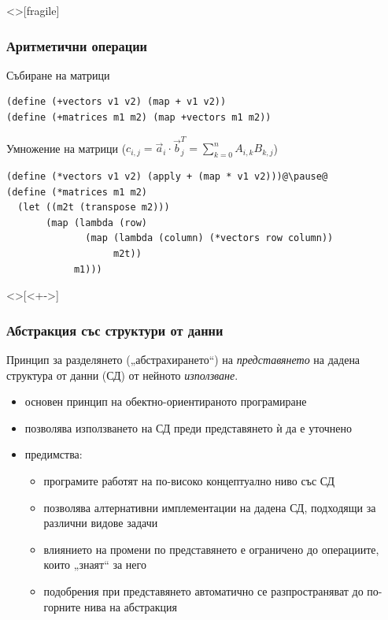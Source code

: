 \documentclass[alsotrans,beameroptions={aspectratio=169}]{beamerswitch}
\begin{document}
\begin{frame}<>[fragile]
  \frametitle{Аритметични операции}

  Събиране на матрици
  \pause
\begin{lstlisting}
(define (+vectors v1 v2) (map + v1 v2))
(define (+matrices m1 m2) (map +vectors m1 m2))
\end{lstlisting}
  \pause
  \vspace{2ex}
  Умножение на матрици \pause
  ($c_{i,j} = \vec a_i\cdot \vec b^T_j = \sum_{k=0}^n A_{i,k}B_{k,j}$)
  \pause
  \small
\begin{lstlisting}
(define (*vectors v1 v2) (apply + (map * v1 v2)))@\pause@
(define (*matrices m1 m2)
  (let ((m2t (transpose m2)))
       (map (lambda (row)
              (map (lambda (column) (*vectors row column))
                   m2t))
            m1)))
\end{lstlisting}
\end{frame}



\begin{frame}<>[<+->]
  \frametitle{Абстракция със структури от данни}

  \begin{definition}[Абстракция]
    Принцип за разделянето („абстрахирането“) на \emph{представянето} на дадена структура от данни (СД) от нейното \emph{използване}.
  \end{definition}
  \begin{itemize}
  \item основен принцип на обектно-ориентираното програмиране
  \item позволява използването на СД преди представянето ѝ да е уточнено
  \item предимства:
    \begin{itemize}
    \item програмите работят на по-високо концептуално ниво със СД
    \item позволява алтернативни имплементации на дадена СД, подходящи за различни видове задачи
    \item влиянието на промени по представянето е ограничено до операциите, които „знаят“ за него
    \item подобрения при представянето автоматично се разпространяват до по-горните нива на абстракция
    \end{itemize}
  \end{itemize}
\end{frame}
\end{document}
